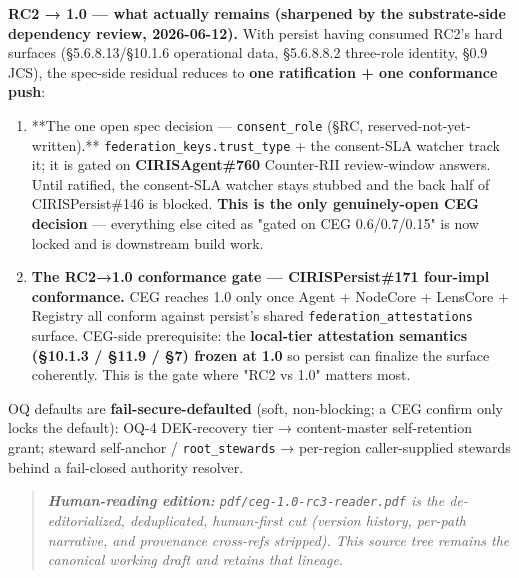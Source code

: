 \documentclass[10pt]{article}
\begin{document}
\textbf{RC2 → 1.0 — what actually remains (sharpened by the substrate-side dependency review, 2026-06-12).} With persist having consumed RC2's hard surfaces (§5.6.8.13/§10.1.6 operational data, §5.6.8.8.2 three-role identity, §0.9 JCS), the spec-side residual reduces to \textbf{one ratification + one conformance push}:

\begin{enumerate}\setlength\itemsep{0pt}
\item **The one open spec decision — \texttt{consent\_role} (§RC, reserved-not-yet-written).** \texttt{federation\_keys.trust\_type} + the consent-SLA watcher track it; it is gated on \textbf{CIRISAgent\#760} Counter-RII review-window answers. Until ratified, the consent-SLA watcher stays stubbed and the back half of CIRISPersist\#146 is blocked. \textbf{This is the only genuinely-open CEG decision} — everything else cited as "gated on CEG 0.6/0.7/0.15" is now locked and is downstream build work.
\item \textbf{The RC2→1.0 conformance gate — CIRISPersist\#171 four-impl conformance.} CEG reaches 1.0 only once Agent + NodeCore + LensCore + Registry all conform against persist's shared \texttt{federation\_attestations} surface. CEG-side prerequisite: the \textbf{local-tier attestation semantics (§10.1.3 / §11.9 / §7) frozen at 1.0} so persist can finalize the surface coherently. This is the gate where "RC2 vs 1.0" matters most.
\end{enumerate}


OQ defaults are \textbf{fail-secure-defaulted} (soft, non-blocking; a CEG confirm only locks the default): OQ-4 DEK-recovery tier → content-master self-retention grant; steward self-anchor / \texttt{root\_stewards} → per-region caller-supplied stewards behind a fail-closed authority resolver.


\begin{quote}\itshape \textbf{Human-reading edition:} \texttt{pdf/ceg-1.0-rc3-reader.pdf} is the de-editorialized, deduplicated, human-first cut (version history, per-path narrative, and provenance cross-refs stripped). This source tree remains the canonical working draft and retains that lineage.\end{quote}
\end{document}
